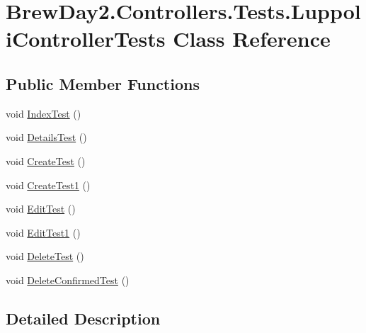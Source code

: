 \hypertarget{class_brew_day2_1_1_controllers_1_1_tests_1_1_luppoli_controller_tests}{}\section{Brew\+Day2.\+Controllers.\+Tests.\+Luppoli\+Controller\+Tests Class Reference}
\label{class_brew_day2_1_1_controllers_1_1_tests_1_1_luppoli_controller_tests}
\subsection*{Public Member Functions}
\begin{DoxyCompactItemize}
\item 
void \mbox{\hyperlink{class_brew_day2_1_1_controllers_1_1_tests_1_1_luppoli_controller_tests_a09ddb48c33a104a1954783a88f8152e8}{Index\+Test}} ()
\item 
void \mbox{\hyperlink{class_brew_day2_1_1_controllers_1_1_tests_1_1_luppoli_controller_tests_ab37ce2b23b334d6b75eebb6540b6abd1}{Details\+Test}} ()
\item 
void \mbox{\hyperlink{class_brew_day2_1_1_controllers_1_1_tests_1_1_luppoli_controller_tests_a3fe450829fe104c344201c19eb4f1b5c}{Create\+Test}} ()
\item 
void \mbox{\hyperlink{class_brew_day2_1_1_controllers_1_1_tests_1_1_luppoli_controller_tests_a9ab9108ad096b8ff932673eac636f2d1}{Create\+Test1}} ()
\item 
void \mbox{\hyperlink{class_brew_day2_1_1_controllers_1_1_tests_1_1_luppoli_controller_tests_aa81365501c4306c8166cb2c732a54666}{Edit\+Test}} ()
\item 
void \mbox{\hyperlink{class_brew_day2_1_1_controllers_1_1_tests_1_1_luppoli_controller_tests_ae2c0438584e9627c036c9c4f5d507993}{Edit\+Test1}} ()
\item 
void \mbox{\hyperlink{class_brew_day2_1_1_controllers_1_1_tests_1_1_luppoli_controller_tests_a0a4c1f092508a551bec92d1bedaff2ba}{Delete\+Test}} ()
\item 
void \mbox{\hyperlink{class_brew_day2_1_1_controllers_1_1_tests_1_1_luppoli_controller_tests_a7db490d2ec1524971544b849b64f905a}{Delete\+Confirmed\+Test}} ()
\end{DoxyCompactItemize}


\subsection{Detailed Description}


